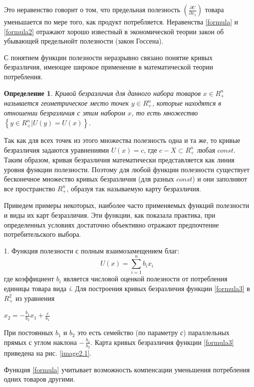 \documentclass[12pt, 4paper]{book}
\newtheorem{definition}{\indent \color{blue} Определение}[chapter]
\begin{document}
{Это неравенство говорит о том, что предельная полезность $\left(\frac{\partial U}{\partial x_{1}}\right) $ товара уменьшается по мере того, как продукт потребляется. Неравенства \eqref{formula} и \eqref{formula2} отражают хорошо известный в экономической теории закон об убывающей предельнойт полезности (закон Госсена).

С понятием функции полезности неразрывно связано понятие кривых безразличия, имеющее широкое применение в математической теории потребления.

\begin{definition}
\label{def2.2}
\rm Кривой безразличия для данного набора товаров $x \in R_{+}^{n}$ называется геометрическое место точек $y\in R_{+}^{n}$, которые находятся в отношении безразличия с этим набором $x$, то есть множество $\left\{y\in R_{+}^{n} | U(y)= U(x) \right\}$.
\end{definition}

Так как для всех точек из этого множества полезность одна и та же, то кривые безразличия задаются уравнениями $U(x)=c$, где $c-X\subset R_{+}^{n}$ любая $const$. Таким образом, кривая безразличия математически представляется как линия уровня функции полезности. Поэтому для любой функции полезности существует бесконечное множество кривых безразличия (для разных $const$) и они заполняют все пространство $R_{+}^{n}$, образуя так называемую карту безразличия.
\par

Приведем примеры некоторых, наиболее часто применяемых функций полезности и виды их карт безразличия. Эти функции, как показала практика, при определенных условиях достаточно объективно отражают предпочтение потребительского выбора.
\par

1. Функция полезности с полным взаимозамещением благ:
\begin{equation}
\label{formula3}
U(x)=\sum \limits_{i=1}^{n}b_{i}x_{i}
\end{equation}
где коэффициент $b_{i}$ является числовой оценкой полезности от потребления единицы товара вида \textit{i}. Для построения кривых безразличия функции \eqref{formula3} в $R_{+}^{2}$ из уравнения 
\begin{center}
$x_{2}=-\frac{b_{1}}{b_{2}}x_{1}+\frac{c}{b_{1}}$
\end{center}
\par

При постоянных $b_{1}$ и $b_{2}$ это есть семейство (по параметру \textit{с}) параллельных прямых с углом наклона $-\,\frac{b_{1}}{b_{2}}$.  Карта кривых безразличия функции \eqref{formula3} приведена на рис. \ref{image2.1}. 
\par
Функция \eqref{formula} учитывает возможность компенсации уменьшения потребления одних товаров другими.

}
\end{document}
